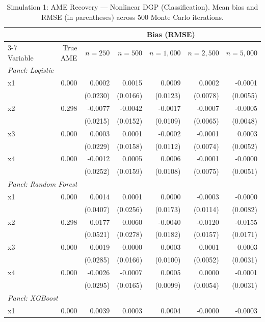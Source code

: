 \begin{table}[htbp]
\centering
\small
\begin{threeparttable}
\caption{Simulation 1: AME Recovery --- Nonlinear DGP (Classification). Mean bias and RMSE (in parentheses) across 500 Monte Carlo iterations.}
\label{tab:sim1_classification_nonlinear}
\begin{tabular}{lrrrrrr}
\toprule
 & & \multicolumn{5}{c}{Bias (RMSE)} \\
\cmidrule(lr){3-7}
Variable & True AME & $n=250$ & $n=500$ & $n=1,000$ & $n=2,500$ & $n=5,000$ \\
\midrule
\multicolumn{7}{l}{\textit{Panel: Logistic}} \\
\quad x1 & 0.000 & 0.0002 & 0.0015 & 0.0009 & 0.0002 & -0.0001 \\
 &  & (0.0230) & (0.0166) & (0.0123) & (0.0078) & (0.0055) \\
\quad x2 & 0.298 & -0.0077 & -0.0042 & -0.0017 & -0.0007 & -0.0005 \\
 &  & (0.0215) & (0.0152) & (0.0109) & (0.0065) & (0.0048) \\
\quad x3 & 0.000 & 0.0003 & 0.0001 & -0.0002 & -0.0001 & 0.0003 \\
 &  & (0.0229) & (0.0158) & (0.0112) & (0.0074) & (0.0052) \\
\quad x4 & 0.000 & -0.0012 & 0.0005 & 0.0006 & -0.0001 & -0.0000 \\
 &  & (0.0252) & (0.0159) & (0.0108) & (0.0075) & (0.0051) \\
\midrule
\multicolumn{7}{l}{\textit{Panel: Random Forest}} \\
\quad x1 & 0.000 & 0.0014 & 0.0001 & 0.0000 & -0.0003 & -0.0000 \\
 &  & (0.0407) & (0.0256) & (0.0173) & (0.0114) & (0.0082) \\
\quad x2 & 0.298 & 0.0177 & 0.0060 & -0.0040 & -0.0120 & -0.0155 \\
 &  & (0.0521) & (0.0278) & (0.0182) & (0.0157) & (0.0171) \\
\quad x3 & 0.000 & 0.0019 & -0.0000 & 0.0003 & 0.0001 & 0.0003 \\
 &  & (0.0285) & (0.0166) & (0.0100) & (0.0052) & (0.0031) \\
\quad x4 & 0.000 & -0.0026 & -0.0007 & 0.0005 & 0.0000 & -0.0001 \\
 &  & (0.0295) & (0.0165) & (0.0099) & (0.0054) & (0.0031) \\
\midrule
\multicolumn{7}{l}{\textit{Panel: XGBoost}} \\
\quad x1 & 0.000 & 0.0039 & 0.0003 & 0.0004 & -0.0000 & -0.0003 \\

\end{tabular}
\end{threeparttable}
\end{table}
